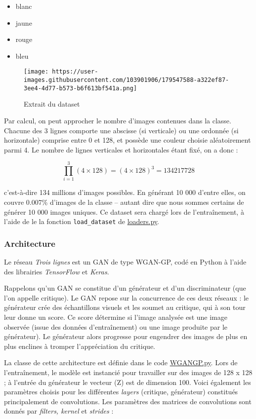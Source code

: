 \documentclass[
]{article}
\providecommand{\tightlist}{%
  \setlength{\itemsep}{0pt}\setlength{\parskip}{0pt}}
\begin{document}
\begin{itemize}
\tightlist
\item
  blanc
\item
  jaune
\item
  rouge
\item
  bleu
\end{itemize}

\begin{figure}
\centering
\texttt{[image: https://user-images.githubusercontent.com/103901906/179547588-a322ef87-3ee4-4d77-b573-b6f613bf541a.png]}
\caption{Extrait du dataset}
\end{figure}

Par calcul, on peut approcher le nombre d'images contenues dans la classe. Chacune des 3 lignes comporte une abscisse (si verticale) ou une ordonnée (si horizontale) comprise entre 0 et 128, et possède une couleur choisie aléatoirement parmi 4. Le nombre de lignes verticales et horizontales étant fixé, on a donc :

\[ \prod_{i=1}^{3} (4 \times 128) = (4 \times 128)^3 = 134217728 \]

c'est-à-dire 134 millions d'images possibles. En générant 10 000 d'entre elles, on couvre 0.007\% d'images de la classe -- autant dire que nous sommes certains de générer 10 000 images uniques. Ce dataset sera chargé lors de l'entraînement, à l'aide de le la fonction \texttt{load\_dataset} de \href{https://github.com/kaugrv/models_words/blob/main/utils/loaders.py}{loaders.py}.

\hypertarget{architecture}{%
\subsubsection{Architecture}\label{architecture}}

Le réseau \emph{Trois lignes} est un GAN de type WGAN-GP, codé en Python à l'aide des librairies \emph{TensorFlow} et \emph{Keras}.

Rappelons qu'un GAN se constitue d'un générateur et d'un discriminateur (que l'on appelle critique). Le GAN repose sur la concurrence de ces deux réseaux : le générateur crée des échantillons visuels et les soumet au critique, qui à son tour leur donne un score. Ce score détermine si l'image analysée est une image observée (issue des données d'entraînement) ou une image produite par le générateur). Le générateur alors progresse pour engendrer des images de plus en plus enclines à tromper l'appréciation du critique.

La classe de cette architecture est définie dans le code \href{https://github.com/kaugrv/models_words/blob/main/models/WGANGP.py}{WGANGP.py}. Lors de l'entraînement, le modèle est instancié pour travailler sur des images de 128 x 128 ; à l'entrée du générateur le vecteur (Z) est de dimension 100. Voici également les paramètres choisis pour les différentes \emph{layers} (critique, générateur) constitués principalement de convolutions. Les paramètres des matrices de convolutions sont donnés par \emph{filters, kernel} et \emph{strides} :
\end{document}
